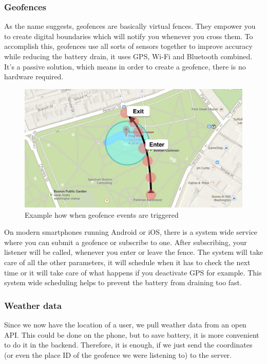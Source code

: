 \documentclass[11pt]{article} %
\begin{document}
\subsubsection{Geofences}
As the name suggests, geofences are basically virtual fences. They empower you to create digital boundaries which will notify you whenever you cross them. To accomplish this, geofences use all sorts of sensors together to improve accuracy while reducing the battery drain, it uses GPS, Wi-Fi and Bluetooth combined. It’s a passive solution, which means in order to create a geofence, there is no hardware required.

\begin{figure}[H]
\begin{center}
\includegraphics[width=1.0\textwidth]{geofences}
\end{center}
\caption{Example how when geofence\cite{geofence} events are triggered}
\label{fig:geofences}
\end{figure}

On modern smartphones running Android or iOS, there is a system wide service where you can submit a geofence or subscribe to one. After subscribing, your listener will be called, whenever you enter or leave the fence. The system will take care of all the other parameters, it will schedule when it has to check the next time or it will take care of what happens if you deactivate GPS for example. This system wide scheduling helps to prevent the battery from draining too fast.

\subsubsection{Weather data}
Since we now have the location of a user, we pull weather data from an open API. This could be done on the phone, but to save battery, it is more convenient to do it in the backend. Therefore, it is enough, if we just send the coordinates (or even the place ID of the geofence we were listening to) to the server.
\end{document}
